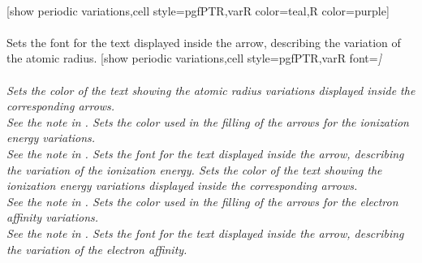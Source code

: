 \\ [5pt][show periodic variations,cell style=pgfPTR,varR color=teal,R color=purple]%
\\ [5pt]\makebox[\linewidth][c]{\scalebox{.6}{\pgfPT[show periodic variations,cell style=pgfPTR,varR color=purple!50!white, R color=purple]}}%
\\ [5pt]\pgfPTendoption%
\vfill%
%
{Sets the font for the text displayed inside the arrow, describing the variation of the atomic radius.}%
\vfill\newpage%
[show periodic variations,cell style=pgfPTR,varR font=\string\small\string\itshape]%
\\ [5pt]\makebox[\linewidth][c]{\scalebox{.6}{\pgfPT[show periodic variations,cell style=pgfPTR,varR font=\small\itshape]}}%
\\ [5pt]\pgfPTendoption%
%
{Sets the color of the text showing the atomic radius variations displayed inside the corresponding arrows.
\\ \textit{See the note in }.}%
%
{Sets the color used in the filling of the \textit{arrows} for the ionization energy variations.
\\ \textit{See the note in }.}%
%
{Sets the font for the text displayed inside the arrow, describing the variation of the ionization energy.}%
%
{Sets the color of the text showing the ionization energy variations displayed inside the corresponding arrows.
\\ \textit{See the note in }.}%
%
{Sets the color used in the filling of the \textit{arrows} for the electron affinity variations.
\\ \textit{See the note in }.}%
%
{Sets the font for the text displayed inside the arrow, describing the variation of the electron affinity.}%
